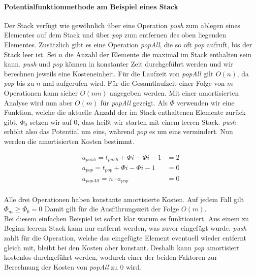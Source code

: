 \documentclass[a4paper,12pt]{article}
\begin{document}
\paragraph{Potentialfunktionmethode am Beispiel eines Stack} 
Der Stack verfügt wie gewöhnlich über eine Operation \textit{push} zum ablegen eines Elementes auf dem Stack und über \textit{pop} zum entfernen des oben liegenden Elementes. Zusätzlich gibt es eine Operation \textit{popAll}, die so oft \textit{pop} aufruft, bis der Stack leer ist. Sei $n$ die Anzahl der Elemente die maximal im Stack enthalten sein kann. \textit{push} und \textit{pop} können in konstanter Zeit durchgeführt werden und wir berechnen jeweils eine Kosteneinheit. Für die Laufzeit von \textit{popAll} gilt $O(n)$, da \textit{pop} bis zu $n$ mal aufgerufen wird. Für die Gesamtlaufzeit einer Folge von $m$ Operationen kann sicher $O(mn)$ angegeben werden. Mit einer amortisierten Analyse wird nun aber $O(m)$ für \textit{popAll} gezeigt. Als $\Phi$ verwenden wir eine Funktion, welche die aktuelle Anzahl der im Stack enthaltenen Elemente zurück gibt. $\Phi_0$ setzen wir auf $0$, dass heißt wir starten mit einem leeren Stack. \textit{push} erhöht also das Potential um eins, während \textit{pop} es um eins vermindert. Nun werden die amortisierten Kosten bestimmt. 

\begin{align*}   
&a_{\mathit{push}} = t_{\mathit{push}} + \Phi{i} - \Phi{i-1}  &= 2\\
&a_{\mathit{pop}} = t_{\mathit{pop}} + \Phi{i} - \Phi{i-1}  &= 0\\
&a_{\mathit{popAll}} = n \cdot a_{\mathit{pop}} &= 0
\end{align*}\\
Alle drei Operationen haben konstante amortisierte Kosten. Auf jedem Fall gilt $ \Phi_m \geq  \Phi_0 = 0 $ Damit gilt für die Ausführungszeit der Folge $O(m)$. \\
Bei diesem einfachen Beispiel ist sofort klar warum es funktioniert. Aus einem zu Beginn leerem Stack kann nur entfernt werden, was zuvor eingefügt wurde. \textit{push} zahlt für die Operation, welche das eingefügte Element eventuell wieder entfernt gleich mit, bleibt bei den Kosten aber konstant. Deshalb kann \textit{pop} amortisiert kostenlos durchgeführt werden, wodurch einer der beiden Faktoren zur Berechnung der Kosten von \textit{popAll} zu $0$ wird.  


\newpage


\end{document}
